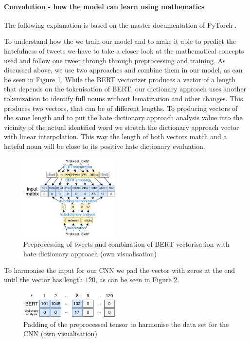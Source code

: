 \documentclass{article}
\begin{document}
\paragraph{Convolution - how the model can learn using mathematics} \label{Subsection 1.3} 
The following explanation is based on the master documentation of PyTorch \cite{PyTorch2019}.

To understand how the we train our model and to make it able to predict the hatefulness of tweets we have to take a closer look at the mathematical concepts used and follow one tweet through through preprocessing and training. As discussed above, we use two approaches and combine them in our model, as can be seen in Figure \ref{fig:vectorization}. While the BERT vectorizer produces a vector of a length that depends on the tokenisation of BERT, our dictionary approach uses another tokenization to identify full nouns without lematization and other changes. This produces two vectors, that can be of different lengths. To producing vectors of the same length and to put the hate dictionary approach analysis value into the vicinity of the actual identified word we stretch the dictionary approach vector with linear interpolation. This way the length of both vectors match and a hateful noun will be close to its positive hate dictionary evaluation.

\begin{figure}[ht]
    \begin{center}
        \includegraphics[width=5cm,keepaspectratio]{writing/02_final-report-latex/figures/processing-regular.pdf}
        \caption{Preprocessing of tweets and combination of BERT vectorisation with hate dictionary approach (own visualisation)}
        \label{fig:vectorization}
    \end{center}
\end{figure}

To harmonise the input for our CNN we pad the vector with zeros at the end until the vector has length $120$, as can be seen in Figure \ref{fig:padding1}.

\begin{figure}[ht]
    \begin{center}
        \includegraphics[width=5cm,keepaspectratio]{writing/02_final-report-latex/figures/processing-padding.pdf}
        \caption{Padding of the preprocessed tensor to harmonise the data set for the CNN (own visualisation)}
        \label{fig:padding1}
    \end{center}
\end{figure}
\end{document}
